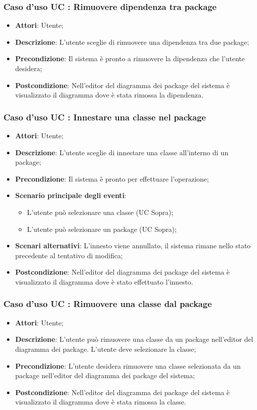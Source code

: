 \documentclass[../AnalisiDeiRequisiti.tex]{subfiles}
\begin{document}
		\subsubsection{Caso d'uso UC : Rimuovere dipendenza tra package}
			\begin{itemize}
				\item \textbf{Attori}: Utente;
				\item \textbf{Descrizione}: L'utente sceglie di rimuovere una dipendenza tra
				due package;
				\item \textbf{Precondizione}: Il sistema è pronto a rimuovere la dipendenza
				che l'utente desidera;
				\item \textbf{Postcondizione}: Nell'editor del diagramma dei package del
				sistema è visualizzato il diagramma dove è stata rimossa la dipendenza.
			\end{itemize}
		\subsubsection{Caso d'uso UC : Innestare una classe nel package}
			\begin{itemize}
				\item \textbf{Attori}: Utente;
				\item \textbf{Descrizione}: L'utente sceglie di innestare una classe
				all'interno di un package;
				\item \textbf{Precondizione}: Il sistema è pronto per effettuare l'operazione;
				\item \textbf{Scenario principale degli eventi}:
					\begin{itemize}
						\item L'utente può selezionare una classe (UC Sopra);
						\item L'utente può selezionare un package (UC Sopra);
					\end{itemize}
				\item \textbf{Scenari alternativi}: L'innesto viene annullato, il sistema
				rimane nello stato precedente al tentativo di modifica;
				\item \textbf{Postcondizione}: Nell'editor del diagramma dei package del
				sistema è visualizzato il diagramma dove è stato effettuato l'innesto.
			\end{itemize}
		\subsubsection{Caso d'uso UC : Rimuovere una classe dal package}
			\begin{itemize}
				\item \textbf{Attori}: Utente;
				\item \textbf{Descrizione}: L'utente può rimuovere una classe da un package
				nell'editor del diagramma dei package. L'utente deve selezionare
				la classe;
				\item \textbf{Precondizione}: L'utente desidera rimuovere una classe
				selezionata da un package nell'editor del diagramma dei package del sistema;
				\item \textbf{Postcondizione}: Nell'editor del diagramma dei package del
				sistema è visualizzato il diagramma dove è stata rimossa la classe.
			\end{itemize}
\end{document}
